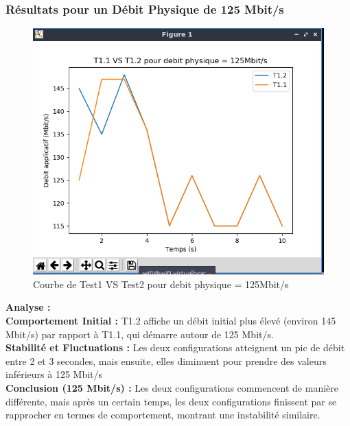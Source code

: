 \vspace{0.5cm}
\subsubsection{Résultats pour un Débit Physique de 125 Mbit/s}
\begin{figure}[H]
    \centering
    \includegraphics[width=1\textwidth]{./images/T1vsT2pour125.png}
    \caption{Courbe de Test1 VS Test2 pour debit physique = 125Mbit/s}
    \label{fig:exemple}
\end{figure}

\textbf{Analyse :}\\
\textbf{Comportement Initial :} T1.2 affiche un débit initial plus élevé (environ 145 Mbit/s) par rapport à T1.1, qui démarre autour de 125 Mbit/s.\\
\textbf{Stabilité et Fluctuations :} Les deux configurations atteignent un pic de débit entre 2 et 3 secondes,  mais ensuite, elles diminuent pour prendre des valeurs inférieurs à 125 Mbit/s\\
\textbf{Conclusion (125 Mbit/s) :}  Les deux configurations commencent de manière différente, mais après un certain temps, les deux configurations finissent par se rapprocher en termes de comportement, montrant une instabilité similaire.

